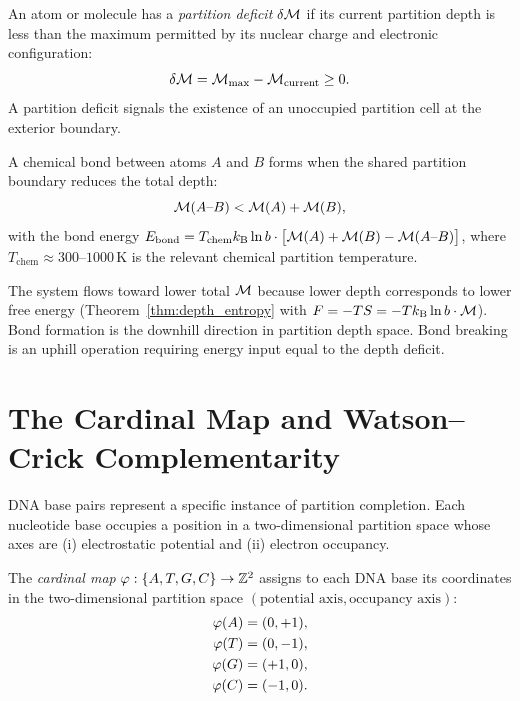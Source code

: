 \begin{definition}
\label{def:partition_deficit}
An atom or molecule has a \emph{partition deficit} $\delta\mathcal{M}$ if its
current partition depth is less than the maximum permitted by its nuclear
charge and electronic configuration:
\begin{equation}
  \delta\mathcal{M} = \mathcal{M}_{\max} - \mathcal{M}_{\mathrm{current}} \geq 0.
\end{equation}
A partition deficit signals the existence of an unoccupied partition cell
at the exterior boundary.
\end{definition}

\begin{proposition}
\label{prop:bond_depth}
A chemical bond between atoms $A$ and $B$ forms when the shared partition
boundary reduces the total depth:
\begin{equation}
  \mathcal{M}(A\text{--}B) < \mathcal{M}(A) + \mathcal{M}(B),
\end{equation}
with the bond energy $E_{\mathrm{bond}} = T_{\mathrm{chem}} k_{\mathrm{B}} \ln b \cdot
\bigl[\mathcal{M}(A) + \mathcal{M}(B) - \mathcal{M}(A\text{--}B)\bigr]$,
where $T_{\mathrm{chem}} \approx 300$--$1000\,\mathrm{K}$ is the relevant
chemical partition temperature.
\end{proposition}

The system flows toward lower total $\mathcal{M}$ because lower depth corresponds
to lower free energy (Theorem~\ref{thm:depth_entropy} with
$F = -TS = -T k_{\mathrm{B}} \ln b \cdot \mathcal{M}$). Bond formation is the downhill
direction in partition depth space. Bond breaking is an uphill operation
requiring energy input equal to the depth deficit.

\section{The Cardinal Map and Watson--Crick Complementarity}
\label{sec:cardinal_map}

DNA base pairs represent a specific instance of partition completion.
Each nucleotide base occupies a position in a two-dimensional partition
space whose axes are (i) electrostatic potential and (ii) electron occupancy.

\begin{definition}
\label{def:cardinal_map}
The \emph{cardinal map} $\varphi: \{A, T, G, C\} \to \mathbb{Z}^2$ assigns
to each DNA base its coordinates in the two-dimensional partition space
$(\text{potential axis}, \text{occupancy axis})$:
\begin{align}
  \varphi(A) &= (0, +1), \label{eq:cardinal_A} \\
  \varphi(T) &= (0, -1), \label{eq:cardinal_T} \\
  \varphi(G) &= (+1, 0), \label{eq:cardinal_G} \\
  \varphi(C) &= (-1, 0). \label{eq:cardinal_C}
\end{align}
\end{definition}

